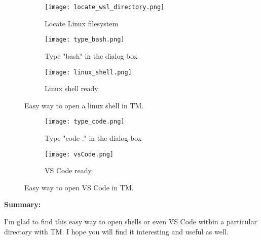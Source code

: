 \documentclass{article}
\begin{document}
\begin{figure}[h!]
	\centering
	\begin{subfigure}[b]{0.4\linewidth}
		\texttt{[image: locate\_wsl\_directory.png]}
		\caption{Locate Linux filesystem}
	\end{subfigure}
	\begin{subfigure}[b]{0.5\linewidth}
		\texttt{[image: type\_bash.png]}
		\caption{Type "bash" in the dialog box}
	\end{subfigure}

	\begin{subfigure}[b]{0.8\linewidth}
		\texttt{[image: linux\_shell.png]}
		\caption{Linux shell ready}
	\end{subfigure}

	\caption{Easy way to open a linux shell in TM.}
	\label{open_linux_shell}	
\end{figure}

\begin{figure}[h!]
	\centering
	\begin{subfigure}[b]{0.48\linewidth}
		\texttt{[image: type\_code.png]}
		\caption{Type "code ." in the dialog box}
	\end{subfigure}
	\begin{subfigure}[b]{0.43\linewidth}
		\texttt{[image: vsCode.png]}
		\caption{VS Code ready}
	\end{subfigure}

	\caption{Easy way to open VS Code in TM.}
	\label{open_linux_shell}	
\end{figure}

\begin{flushleft}
	\textbf{\normalsize  Summary:}
\end{flushleft}

\begin{flushleft}
	\normalsize I'm glad to find this easy way to open shells or even VS Code within a particular directory with TM. I hope you will find it interesting and useful as well.
\end{flushleft}
\end{document}
